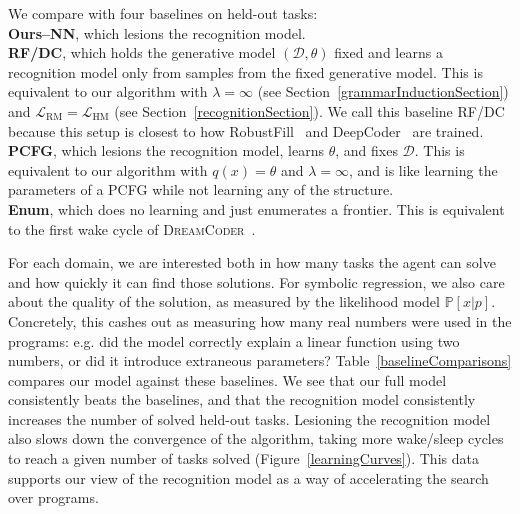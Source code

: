 \documentclass{article}
\newcommand{\system}{\textsc{DreamCoder}~}
\newcommand{\probability}{\mathds{P}} %
\begin{document}
We compare  with four baselines on  held-out tasks:
\\\noindent \textbf{Ours--NN}, which lesions the recognition model.
\\\noindent \textbf{RF/DC}, which holds the generative model $(\mathcal{D},\theta)$ fixed and learns
a recognition model only from samples from the fixed generative model.
This is equivalent to our algorithm with $\lambda = \infty$ (see Section~\ref{grammarInductionSection})
and $\mathcal{L}_{\text{RM}} = \mathcal{L}_{\text{HM}}$ (see Section~\ref{recognitionSection}).
We call this baseline RF/DC because
this setup is closest to how RobustFill~\cite{devlin2017robustfill} and DeepCoder~\cite{balog2016deepcoder} are trained.
\\\noindent \textbf{PCFG}, which lesions the recognition model, learns $\theta$, and fixes $\mathcal{D}$.
This is equivalent to our algorithm with $q(x) = \theta$ and $\lambda = \infty$,
and is like learning the parameters of a PCFG while not learning any of the structure.
\\\noindent \textbf{Enum}, which does no learning and just enumerates a frontier.
This is equivalent to the first wake cycle of \system.   

For each domain,
we are interested both in how many tasks the
agent can solve and how quickly it can find those solutions.
For symbolic regression, we also care about the quality
of the solution, as measured by the likelihood model $\probability[x|p]$.
Concretely, this cashes out as measuring how many
real numbers were used in the programs: e.g. did the model correctly explain a linear function
using two numbers, or did it introduce extraneous parameters?
Table~\ref{baselineComparisons}
compares our model against these baselines.
We see that our full model consistently
beats the baselines,
and that the recognition model 
consistently increases the number of solved held-out tasks.
Lesioning the recognition model also slows down the convergence of the algorithm,
taking more wake/sleep cycles to reach a given number of tasks solved (Figure~\ref{learningCurves}).
This data supports our view of the recognition model as a way of accelerating the search over programs.
\end{document}
